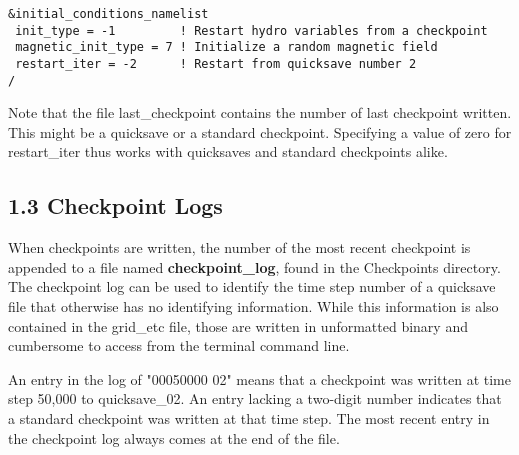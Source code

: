 \begin{lstlisting}
&initial_conditions_namelist
 init_type = -1         ! Restart hydro variables from a checkpoint
 magnetic_init_type = 7 ! Initialize a random magnetic field
 restart_iter = -2      ! Restart from quicksave number 2
/
\end{lstlisting}

Note that the file last\_checkpoint contains the number of last checkpoint written.  This might be a quicksave or a standard checkpoint.  Specifying a value of zero for restart\_iter thus works with quicksaves and standard checkpoints alike.

\subsection{1.3 Checkpoint Logs}
When checkpoints are written, the number of the most recent checkpoint is appended to a file named \textbf{checkpoint\_log}, found in the Checkpoints directory.   The checkpoint log can be used to identify  the time step number of a quicksave file that otherwise has no identifying information.  While this information is also contained in the grid\_etc file, those are written in unformatted binary and cumbersome to access from the terminal command line.

An entry in the log of "00050000 02" means that a checkpoint was written at time step 50,000 to quicksave\_02.  An entry lacking a two-digit number indicates that a standard checkpoint was written at that time step.  The most recent entry in the checkpoint log always comes at the end of the file.
